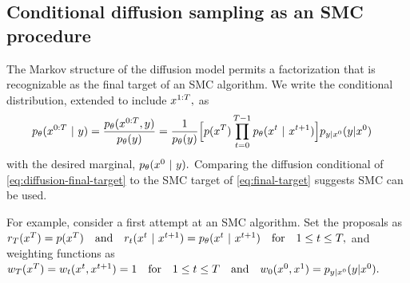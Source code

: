\subsection{Conditional diffusion sampling as an SMC procedure}\label{subsec:SMC_framing}
The Markov structure of the diffusion model permits a factorization that is recognizable as the final target of an SMC algorithm.
We  write the conditional distribution, extended to  include $x^{1:T},$ as
\begin{align}\label{eq:diffusion-final-target}
    \pmodel(\dt{x}{0:T} \mid y) &=  
    \ifnum\workshopsubmission=0
        \frac{\pmodel (\dt{x}{0:T} ,y)}{\pmodel(y)} = 
    \fi
    \frac{1}{\pmodel(y)}\Big[p(\xT) \prod_{t=0}^{T-1} \pmodel (\xt \mid \xtpo )  \Big] \plikelihood{y}{\xzero}
\end{align}
with the desired marginal, $p_{\theta}(x^{0} ~\vert~ y).$
Comparing the diffusion conditional of \cref{eq:diffusion-final-target} to the SMC target of \cref{eq:final-target} suggests SMC can be used.

For example, consider a first attempt at an SMC algorithm.
Set the proposals as
$r_T(x^{T})= p(x^{T})\quad \mathrm{and} \quad
r_t(x^{t} ~\vert~ x^{t+1}) = p_{\theta} (x^{t} ~\vert~ x^{t+1})\quad \mathrm{for}\quad 1\le t \le T,$
and weighting functions as  
$w_T(x^{T})=w_t(x^{t}, x^{t+1})=1\quad \mathrm{for} \quad 1\le t \le T \quad \mathrm{and} \quad w_0 (x^{0}, x^{1}) = p_{y|x^{0}}({y}|{x^{0}}).$

